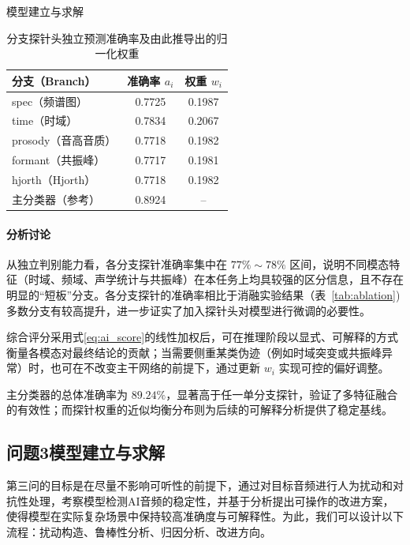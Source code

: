 \documentclass[aspectratio=169]{beamer}
\begin{document}
\begin{frame}{模型建立与求解}
\begin{table}[htbp]
\centering
\caption{分支探针头独立预测准确率及由此推导出的归一化权重}
\label{tab:probe-acc-weight}
\begin{tabular}{lcc}
\toprule
分支（Branch） & 准确率 $a_i$ & 权重 $w_i$ \\
\midrule
spec（频谱图）      & 0.7725 & 0.1987 \\
time（时域）        & 0.7834 & 0.2067 \\
prosody（音高音质） & 0.7718 & 0.1982 \\
formant（共振峰）   & 0.7717 & 0.1981 \\
hjorth（Hjorth）    & 0.7718 & 0.1982 \\
\midrule
主分类器（参考）    & 0.8924 & -- \\
\bottomrule
\end{tabular}
\end{table}

\paragraph{分析讨论}\par

从独立判别能力看，各分支探针准确率集中在 $77\%\sim78\%$ 区间，说明不同模态特征（时域、频域、声学统计与共振峰）在本任务上均具较强的区分信息，且不存在明显的“短板”分支。各分支探针的准确率相比于消融实验结果（表~\ref{tab:ablation})多数分支有较高提升，进一步证实了加入探针头对模型进行微调的必要性。

综合评分采用式\ref{eq:ai_score}的线性加权后，可在推理阶段以显式、可解释的方式衡量各模态对最终结论的贡献；当需要侧重某类伪迹（例如时域突变或共振峰异常）时，也可在不改变主干网络的前提下，通过更新 $w_i$ 实现可控的偏好调整。

主分类器的总体准确率为 $89.24\%$，显著高于任一单分支探针，验证了多特征融合的有效性；而探针权重的近似均衡分布则为后续的可解释分析提供了稳定基线。


\subsection{问题3模型建立与求解}

第三问的目标是在尽量不影响可听性的前提下，通过对目标音频进行人为扰动和对抗性处理，考察模型检测AI音频的稳定性，并基于分析提出可操作的改进方案，使得模型在实际复杂场景中保持较高准确度与可解释性。为此，我们可以设计以下流程：扰动构造、鲁棒性分析、归因分析、改进方向。



\end{frame}
\end{document}
